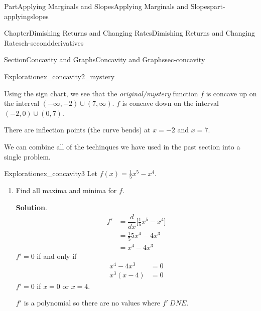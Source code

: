 \documentclass[oneside,10pt,]{tufte-book}
\newcommand{\blocktitlefont}{\relax}
\numberwithin{equation}{chapter}
\newcommand{\ddx}[1]{ \dfrac{d}{dx} \Big[ #1 \Big]  }
\newcommand{\amp}{&}
\begin{document}
\begin{partptx}{Part}{Applying Marginals and Slopes}{}{Applying Marginals and Slopes}{}{}{part-applyingslopes}
\begin{chapterptx}{Chapter}{Dimishing Returns and Changing Rates}{}{Dimishing Returns and Changing Rates}{}{}{ch-secondderivatives}
\begin{sectionptx}{Section}{Concavity and Graphs}{}{Concavity and Graphs}{}{}{sec-concavity}
\begin{exploration}{Exploration}{}{ex_concavity2_mystery}
\begin{enumerate}[font=\bfseries,label=(\alph*),ref=\alph*]
\begin{image}{0.125}{0.75}{0.125}{}
{
}%
\end{image}%
%
\par
Using the sign chart, we see that the \emph{original\slash{}mystery} function \(f\) is concave up on the interval \((-\infty,-2)\cup(7,\infty)\).  \(f\) is concave down on the interval \((-2,0)\cup(0,7)\).%
\par
There are inflection points (the curve bends) at \(x=-2\) and \(x=7\).%
\end{enumerate}%
\end{exploration}%
We can combine all of the techinques we have used in the past section into a single problem.%
\begin{exploration}{Exploration}{}{ex_concavity3}%
Let \(f(x) = \frac{1}{5}x^5 - x^4\).%
\begin{enumerate}[font=\bfseries,label=(\alph*),ref=\alph*]%
\item{}Find all maxima and minima for \(f\).%
\par\smallskip%
\noindent\textbf{\blocktitlefont Solution}.\hypertarget{ex_concavity3-2-2}{}\quad{}%
\begin{align*}
f' \amp = \ddx{ \frac{1}{5}x^5 - x^4}\\
\amp = \frac{1}{5}5x^4 - 4x^3\\
\amp = x^4 - 4x^3
\end{align*}
\(f'=0\) if and only if%
\begin{align*}
x^4-4x^3 \amp =0\\
x^3(x-4) \amp =0
\end{align*}
\(f'=0\) if \(x=0\) or \(x=4\).%
\par
\(f'\) is a polynomial so there are no values where \(f'\ DNE\). \begin{image}{0.25}{0.5}{0.25}{}%
\end{image}
\end{enumerate}
\end{exploration}
\end{sectionptx}
\end{chapterptx}
\end{partptx}
\end{document}
